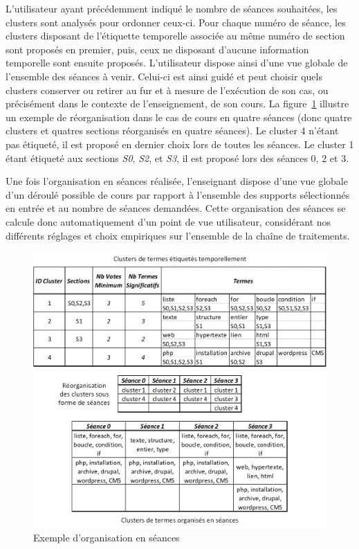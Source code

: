L'utilisateur ayant précédemment indiqué le nombre de séances souhaitées, les clusters sont analysés pour ordonner ceux-ci.
Pour chaque numéro de séance, les clusters disposant de l'étiquette temporelle associée au même numéro de section sont proposés en premier, puis, ceux ne disposant d'aucune information temporelle sont ensuite proposés.
L'utilisateur dispose ainsi d'une vue globale de l'ensemble des séances à venir.
Celui-ci est ainsi guidé et peut choisir quels clusters conserver ou retirer au fur et à mesure de l'exécution de son cas, ou précisément dans le contexte de l'enseignement, de son cours.
La figure~\ref{figure:5-III-4-ExempleOrganisationSeances} illustre un exemple de réorganisation dans le cas de cours en quatre séances (donc quatre clusters et quatres sections réorganisés en quatre séances).
Le cluster 4 n'étant pas étiqueté, il est proposé en dernier choix lors de toutes les séances.
Le cluster 1 étant étiqueté aux sections \textit{S0}, \textit{S2}, et \textit{S3}, il est proposé lors des séances 0, 2 et 3.

\bigskip

Une fois l'organisation en séances réalisée, l'enseignant dispose d'une vue globale d'un déroulé possible de cours par rapport à l'ensemble des supports sélectionnés en entrée et au nombre de séances demandées.
Cette organisation des séances se calcule donc automatiquement d'un point de vue utilisateur, considérant nos différents réglages et choix empiriques sur l'ensemble de la chaîne de traitements.

\newpage

\hspace{0pt}
\vfill

\begin{figure}[ht]
\centering
\centerline{  %
\includegraphics[scale=1]{5-Conclusion/images/3-analyse-temporelle/exemple_organisation_seances.png}
}
\caption{Exemple d'organisation en séances}
\label{figure:5-III-4-ExempleOrganisationSeances}
\end{figure}

